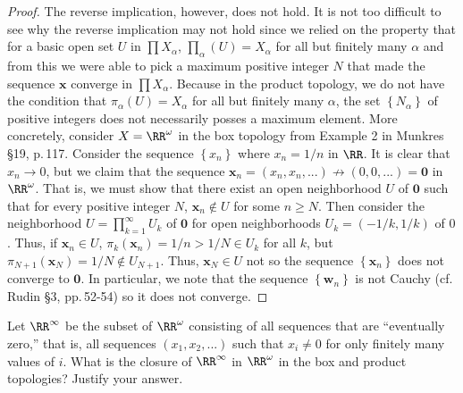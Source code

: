 \begin{proof}
The reverse implication, however, does not hold. It is not too
difficult to see why the reverse implication may not hold since
we relied on the property that for a basic open set $U$ in $\prod
X_\alpha$, $\prod_\alpha(U)=X_\alpha$ for all but finitely many
$\alpha$ and from this we were able to pick a maximum positive
integer $N$ that made the sequence $\mathbf{x}$ converge in
$\prod X_\alpha$. Because in the product topology, we do not have
the condition that $\pi_\alpha(U)=X_\alpha$ for all but finitely
many $\alpha$, the set $\left\{N_\alpha\right\}$ of positive
integers does not necessarily posses a maximum element. More
concretely, consider $X=\RR^\omega$ in the box topology from
Example 2 in Munkres \S19, p.\,117. Consider the sequence
$\left\{x_n\right\}$ where $x_n=1/n$ in $\RR$. It is clear that
$x_n\to 0$, but we claim that the sequence
$\mathbf{x}_n=(x_n,x_n,...)\nrightarrow(0,0,...)=\mathbf{0}$ in
$\RR^\omega$. That is, we must show that there exist an open
neighborhood $U$ of $\mathbf{0}$ such that for every positive
integer $N$, $\mathbf{x}_n\notin U$ for some $n\geq N$. Then
consider the neighborhood $U=\prod_{k=1}^\infty U_k$ of
$\mathbf{0}$ for open neighborhoods $U_k=(-1/k,1/k)$ of
$0$. Thus, if $\mathbf{x}_n\in U$,
$\pi_k(\mathbf{x}_n)=1/n>1/N\in U_k$ for all $k$, but
$\pi_{N+1}(\mathbf{x}_N)=1/N\notin U_{N+1}$. Thus,
$\mathbf{x}_N\in U$ not so the sequence
$\left\{\mathbf{x}_n\right\}$ does not converge to
$\mathbf{0}$. In particular, we note that the sequence
$\left\{\mathbf{w}_n\right\}$ is not Cauchy (cf.\,Rudin \S3,
pp.\,52-54) so it does not converge.
\end{proof}
\newpage
\begin{problem}[Munkres \S19, p.\,118, \#7]
Let $\RR^\infty$ be the subset of $\RR^\omega$ consisting of all
sequences that are ``eventually zero,'' that is, all sequences
$(x_1,x_2,...)$ such that $x_i\neq 0$ for only finitely many
values of $i$. What is the closure of $\RR^\infty$ in
$\RR^\omega$ in the box and product topologies? Justify your
answer.
\end{problem}
